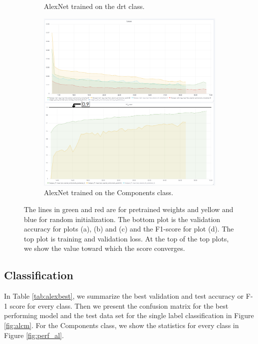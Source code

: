 \begin{figure}
{\begin{subfigure}[b]{.6\textwidth}
\caption{AlexNet trained on the \gls{drt} class.}
\label{fig:alexinit_drt}
\end{subfigure}%
\begin{subfigure}[b]{.6\textwidth}
\centering
\includegraphics[width=.95\textwidth]{figures/04-al_components_acc.PNG}
\caption{AlexNet trained on the Components class.}
\label{fig:alexinit_comp}
\end{subfigure}%
}
\caption[Training and validation plots for AlexNet]{The lines in green and red are for pretrained weights and yellow and blue for random initialization. The bottom plot is the validation accuracy for plots (a), (b) and (c) and the F1-score for plot (d). The top plot is training  and validation loss. At the top of the top plots, we show the value toward which the score converges.}
\label{fig:plotsalex}
\end{figure}


\subsection{Classification}
In Table \ref{tab:alexbest}, we summarize the best validation and test accuracy or F-1 score for every class. Then we present the confusion matrix for the best performing model and the test data set for the single label classification in Figure \ref{fig:alcm}. For the Components class, we show the statistics for every class in Figure \ref{fig:perf_al}. 

